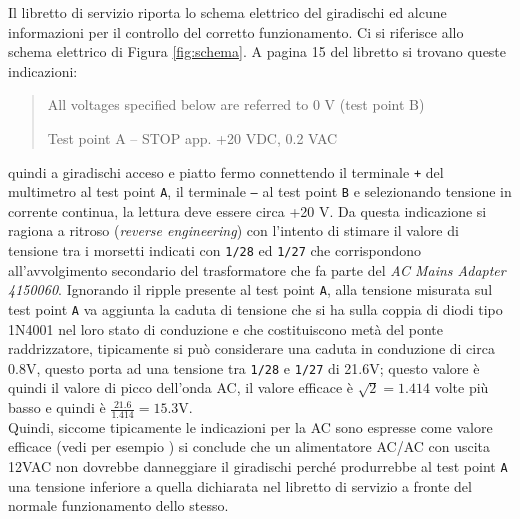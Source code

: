 \documentclass[a4paper,12pt]{article} %
\begin{document}
Il libretto di servizio \cite{libretto} riporta lo schema elettrico del giradischi ed
alcune informazioni per il controllo del corretto
funzionamento. Ci si riferisce allo schema elettrico di Figura \ref{fig:schema}. A pagina 15 del libretto si trovano queste indicazioni:

\begin{quote}
All voltages specified below are referred to 0 V (test point B)

Test point A -- STOP app. +20 VDC, 0.2 VAC
\end{quote}

quindi a giradischi acceso e piatto fermo connettendo il terminale \texttt{+}
del multimetro al test point \texttt{A}, il terminale \texttt{--} al test point \texttt{B}
e selezionando tensione in corrente continua, la lettura
deve essere circa +20 V. Da questa indicazione si ragiona a ritroso (\emph{reverse engineering})
con l'intento di stimare il valore di tensione tra i morsetti indicati
con \texttt{1/28} ed \texttt{1/27} che corrispondono all'avvolgimento secondario
del trasformatore che fa parte del \emph{AC Mains Adapter 4150060}.
Ignorando il ripple presente al test point \texttt{A}, alla tensione 
misurata sul test point \texttt{A} va aggiunta la caduta di tensione
che si ha sulla coppia di diodi tipo 1N4001 nel loro stato di 
conduzione e che costituiscono metà del ponte raddrizzatore, 
tipicamente si può considerare una caduta in conduzione di
circa 0.8V\cite{datasheet}, questo porta ad una tensione tra \texttt{1/28} e \texttt{1/27}
di 21.6V; questo valore è quindi il valore di picco
dell'onda AC, il valore efficace è $\sqrt{2}=1.414$
volte più basso e quindi è $\frac{21.6}{1.414}=15.3$V.\\

Quindi, siccome tipicamente le indicazioni per la AC
sono espresse come valore efficace (vedi per esempio \cite{norma}) si conclude che
un alimentatore AC/AC con uscita 12VAC non dovrebbe danneggiare
il giradischi perché  produrrebbe al test point \texttt{A} una tensione
inferiore a quella dichiarata nel libretto di servizio a fronte del
normale funzionamento dello stesso.\\
\end{document}
